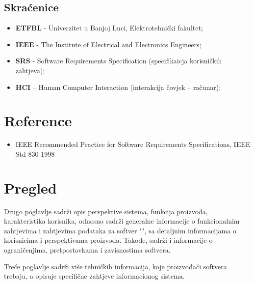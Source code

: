 \subsection{Skraćenice}
\begin{itemize}
\item \textbf{ETFBL} - Univerzitet u Banjoj Luci, Elektrotehnički fakultet;
\item \textbf{IEEE} - The Institute of Electrical and Electronics Engineers;
\item \textbf{SRS} - Software Requirements Specification (specifikaicja korisničkih zahtjeva);
\item \textbf{HCI} – Human Computer Interaction (interakcija čovjek – računar);

\end{itemize}

\section{Reference}

\begin{itemize}
\item IEEE Recommended Practice for Software Requirements Specifications, IEEE Std 830-1998
\end{itemize}
\section{Pregled}

Drugo poglavlje sadrži opis perspektive sistema, funkcija proizvoda, karakteristika korisnika, odnosno sadrži generalne informacije o funkcionalnim zahtjevima i zahtjevima podataka za softver "\naziv", sa detaljnim informacijama o korisnicima i perspektivama proizvoda. Takođe, sadrži i informacije o ograničenjima, pretpostavkama i zavisnostima softvera.

Treće poglavlje sadrži više tehničkih informacija, koje proizvođači softvera trebaju, a opisuje specifične zahtjeve informacionog sistema.
